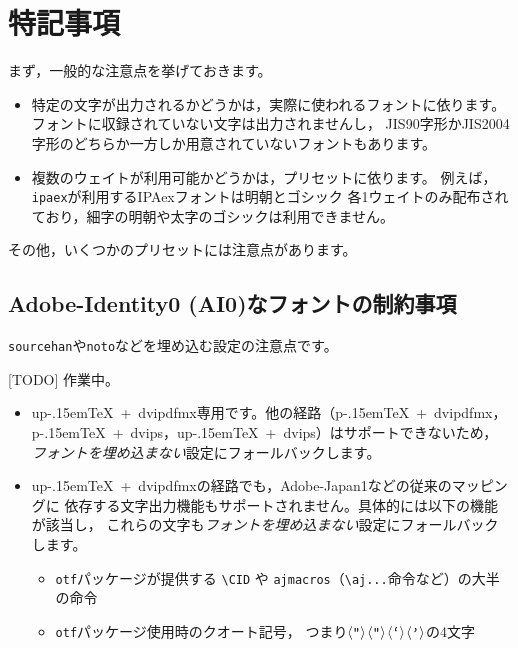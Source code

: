 \documentclass{jlreq}
\def\file#1{\texttt{#1}}
\def\command#1{\texttt{#1}}
\def\codechar#1{\ensuremath{\langle\mbox{\texttt{#1}}\rangle}}
\def\pTeX{p\kern-.15em\TeX}
\def\upTeX{u\pTeX}
\begin{document}
\clearpage


\section{特記事項}

まず，一般的な注意点を挙げておきます。
\begin{itemize}
  \item 特定の文字が出力されるかどうかは，実際に使われるフォントに依ります。
        フォントに収録されていない文字は出力されませんし，
        JIS90字形かJIS2004字形のどちらか一方しか用意されていないフォントもあります。
  \item 複数のウェイトが利用可能かどうかは，プリセットに依ります。
        例えば，\command{ipaex}が利用するIPAexフォントは明朝とゴシック
        各1ウェイトのみ配布されており，細字の明朝や太字のゴシックは利用できません。
\end{itemize}

その他，いくつかのプリセットには注意点があります。

\subsection{Adobe-Identity0 (AI0)なフォントの制約事項}\label{ai0}

\command{sourcehan}や\command{noto}などを埋め込む設定の注意点です。

[TODO] 作業中。

\begin{itemize}
  \item \upTeX~+~dvipdfmx専用です。他の経路（\pTeX~+~dvipdfmx，
        \pTeX~+~dvips，\upTeX~+~dvips）はサポートできないため，
        \emph{フォントを埋め込まない}設定にフォールバックします。
  \item \upTeX~+~dvipdfmxの経路でも，Adobe-Japan1などの従来のマッピングに
        依存する文字出力機能もサポートされません。具体的には以下の機能が該当し，
        これらの文字も\emph{フォントを埋め込まない}設定にフォールバックします。
    \begin{itemize}
      \item \file{otf}パッケージが提供する \verb+\CID+ や
            \file{ajmacros}（\verb+\aj...+命令など）の大半の命令
      \item \file{otf}パッケージ使用時のクオート記号，
            つまり\codechar{“}\codechar{”}\codechar{‘}\codechar{’}の4文字
    \end{itemize}
\end{itemize}
\end{document}

